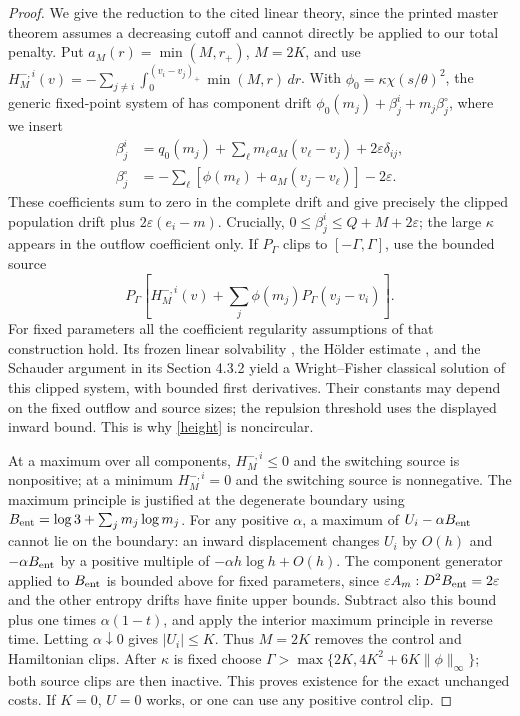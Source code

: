 \documentclass[11pt,a4paper]{article}
\begin{document}
\begin{proof}
We give the reduction to the cited linear theory, since the printed
master theorem \cite[Theorem 3.4]{BCCD} assumes a decreasing cutoff
and cannot directly be applied to our total penalty.
Put $a_M(r)=\min(M,r_+)$, $M=2K$, and use
$H_M^{-,i}(v)=-\sum_{j\ne i}\int_0^{(v_i-v_j)_+}\min(M,r)\,dr$.
With $\phi_0=\kappa\chi(s/\theta)^2$, the generic fixed-point system
of \cite[Section 4.3.2, (4.16)--(4.18)]{BCCD} has component drift
$\phi_0(m_j)+\beta_j^i+m_j\beta_j^\circ$, where we insert
\[
 \begin{split}
 \beta_j^i&=q_0(m_j)+\sum_\ell m_\ell a_M(v_\ell-v_j)
                         +2\varepsilon\delta_{ij},\\
 \beta_j^\circ&=-\sum_\ell[\phi(m_\ell)+a_M(v_j-v_\ell)]
                         -2\varepsilon.
 \end{split}
\]
These coefficients sum to zero in the complete drift and give precisely
the clipped population drift plus $2\varepsilon(e_i-m)$.
Crucially, $0\leq\beta_j^i\leq Q+M+2\varepsilon$; the large
$\kappa$ appears in the outflow coefficient only. If
$P_\Gamma$ clips to $[-\Gamma,\Gamma]$, use the bounded source
\[
 P_\Gamma\left[H_M^{-,i}(v)
                +\sum_j\phi(m_j)P_\Gamma(v_j-v_i)\right].
\]
For fixed parameters all the coefficient regularity assumptions of
that construction hold. Its frozen linear solvability
\cite[Lemma 4.4]{BCCD}, the H\"older estimate
\cite[Theorem 2.10]{BCCD}, and the Schauder argument in its
Section 4.3.2 yield a Wright--Fisher classical solution of this clipped
system, with bounded first derivatives. Their constants may depend on
the fixed outflow and source sizes; the repulsion threshold uses the
displayed inward bound. This is why \eqref{height} is noncircular.

At a maximum over all components, $H_M^{-,i}\leq0$ and the switching
source is nonpositive; at a minimum $H_M^{-,i}=0$ and the switching
source is nonnegative. The maximum principle is justified at the
degenerate boundary using
$B_{\rm ent}=\log3+\sum_jm_j\log m_j$.
For any positive $\alpha$, a maximum of $U_i-\alpha B_{\rm ent}$
cannot lie on the boundary: an inward displacement changes $U_i$ by
$O(h)$ and $-\alpha B_{\rm ent}$ by a positive multiple of
$-\alpha h\log h+O(h)$. The component generator applied to
$B_{\rm ent}$ is bounded above for fixed parameters, since
$\varepsilon A_m:D^2B_{\rm ent}=2\varepsilon$ and the other entropy
drifts have finite upper bounds. Subtract also this bound plus one
times $\alpha(1-t)$, and apply the interior maximum principle in
reverse time. Letting $\alpha\downarrow0$ gives $|U_i|\leq K$.
Thus $M=2K$ removes the control and Hamiltonian clips. After $\kappa$
is fixed choose
$\Gamma>\max\{2K,4K^2+6K\|\phi\|_\infty\}$; both source clips
are then inactive. This proves existence for the exact unchanged
costs. If $K=0$, $U=0$ works, or one can use any positive control clip.


\end{proof}
\end{document}
